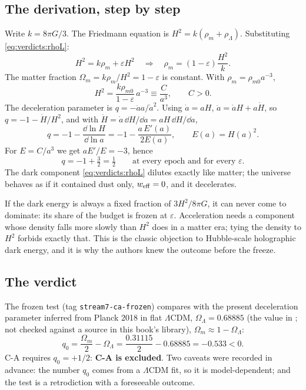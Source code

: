 \subsection{The derivation, step by step}

Write $k=8\pi G/3$. The Friedmann equation is $H^2=k(\rho_m+\rho_\Lambda)$. Substituting
\eqref{eq:verdicts:rhoL}:
\[
 H^2=k\rho_m+\varepsilon H^2\quad\Longrightarrow\quad \rho_m=(1-\varepsilon)\frac{H^2}{k}.
\]
The matter fraction $\Omega_m=k\rho_m/H^2=1-\varepsilon$ is constant. With
$\rho_m=\rho_{m0}a^{-3}$,
\[
 H^2=\frac{k\rho_{m0}}{1-\varepsilon}\,a^{-3}\equiv\frac{C}{a^3},\qquad C>0 .
\]
The deceleration parameter is $q=-\ddot aa/\dot a^2$. Using $\dot a=aH$,
$\ddot a=\dot aH+a\dot H$, so $q=-1-\dot H/H^2$, and with $\dot H=\dot a\,\dd H/\dd a=aH\,\dd H/\dd a$,
\begin{equation}\label{eq:verdicts:q}
 q=-1-\frac{\dd\ln H}{\dd\ln a}=-1-\frac{a\,E'(a)}{2E(a)},\qquad E(a)=H(a)^2 .
\end{equation}
For $E=C/a^3$ we get $aE'/E=-3$, hence
\[
 q=-1+\tfrac32=\tfrac12\qquad\text{at every epoch and for every }\varepsilon .
\]
The dark component \eqref{eq:verdicts:rhoL} dilutes exactly like matter; the universe behaves as
if it contained dust only, $w_{\rm eff}=0$, and it decelerates.

\begin{physicsbox}
If the dark energy is always a fixed fraction of $3H^2/8\pi G$, it can never come to dominate:
its share of the budget is frozen at $\varepsilon$. Acceleration needs a component whose density
falls more slowly than $H^2$ does in a matter era; tying the density to $H^2$ forbids exactly
that. This is the classic objection to Hubble-scale holographic dark energy, and it is why the
authors knew the outcome before the freeze.
\end{physicsbox}

\subsection{The verdict}

The frozen test (tag \texttt{stream7-ca-frozen}) compares with the present deceleration parameter
inferred from Planck 2018 in flat $\Lambda$CDM, $\Omega_\Lambda=0.68885$ (the value in
\allowbreak{}; not checked against a source in this book's library),
$\Omega_m\approx1-\Omega_\Lambda$:
\[
 q_0=\frac{\Omega_m}{2}-\Omega_\Lambda=\frac{0.31115}{2}-0.68885=-0.533<0 .
\]
C-A requires $q_0=+1/2$: \textbf{C-A is excluded}. Two caveats were recorded in advance: the
number $q_0$ comes from a $\Lambda$CDM fit, so it is model-dependent; and the test is a
retrodiction with a foreseeable outcome.


